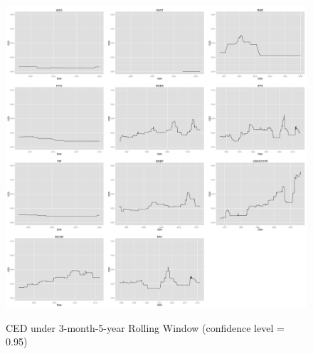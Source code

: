 \documentclass[12pt]{article}
\begin{document}
\begin{figure}[h]
\caption{CED under 3-month-5-year Rolling Window (confidence level = 0.95)} 
\centering 
\includegraphics[width=15cm]{../results/CED_3mon_5yr_95}
\label{fig: CED3mon5yr95}
\end{figure}


% 
% 
\end{document}
